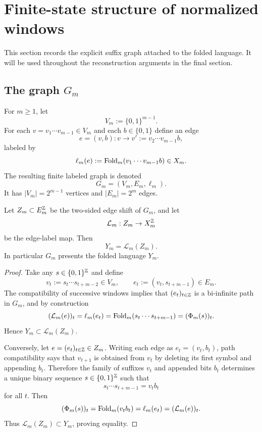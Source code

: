 \section{Finite-state structure of normalized windows}

This section records the explicit suffix graph attached to the folded language.
It will be used throughout the reconstruction arguments in the final section.

\subsection{The graph \texorpdfstring{$G_m$}{Gm}}

\begin{definition}
\label{def:G-m}
For $m\ge 1$, let
\[
V_m:=\{0,1\}^{m-1}.
\]
For each $v=v_1\cdots v_{m-1}\in V_m$ and each $b\in\{0,1\}$ define an edge
\[
e=(v,b):v\to v':=v_2\cdots v_{m-1}b,
\]
labeled by
\[
\ell_m(e):=\operatorname{Fold}_m(v_1\cdots v_{m-1}b)\in X_m.
\]
The resulting finite labeled graph is denoted
\[
G_m=(V_m,E_m,\ell_m).
\]
It has $\lvert V_m\rvert=2^{m-1}$ vertices and $\lvert E_m\rvert=2^m$ edges.
\end{definition}

\begin{theorem}
\label{thm:Phi-m-sofic-graph}
Let $Z_m\subset E_m^{\mathbb{Z}}$ be the two-sided edge shift of $G_m$, and let
\[
\mathcal L_m:Z_m\to X_m^{\mathbb{Z}}
\]
be the edge-label map.  Then
\[
Y_m=\mathcal L_m(Z_m).
\]
In particular $G_m$ presents the folded language $Y_m$.
\end{theorem}

\begin{proof}
Take any $s\in\{0,1\}^{\mathbb{Z}}$ and define
\[
v_t:=s_t\cdots s_{t+m-2}\in V_m,
\qquad
e_t:=(v_t,s_{t+m-1})\in E_m.
\]
The compatibility of successive windows implies that $(e_t)_{t\in\mathbb{Z}}$ is a
bi-infinite path in $G_m$, and by construction
\[
(\mathcal L_m(e))_t
=
\ell_m(e_t)
=
\operatorname{Fold}_m(s_t\cdots s_{t+m-1})
=
(\Phi_m(s))_t.
\]
Hence $Y_m\subset \mathcal L_m(Z_m)$.

Conversely, let $e=(e_t)_{t\in\mathbb{Z}}\in Z_m$.  Writing each edge as
$e_t=(v_t,b_t)$, path compatibility says that $v_{t+1}$ is obtained from $v_t$
by deleting its first symbol and appending $b_t$.  Therefore the family of
suffixes $v_t$ and appended bits $b_t$ determines a unique binary sequence
$s\in\{0,1\}^{\mathbb{Z}}$ such that
\[
s_t\cdots s_{t+m-1}=v_tb_t
\]
for all $t$.  Then
\[
(\Phi_m(s))_t
=
\operatorname{Fold}_m(v_tb_t)
=
\ell_m(e_t)
=
(\mathcal L_m(e))_t.
\]
Thus $\mathcal L_m(Z_m)\subset Y_m$, proving equality.
\end{proof}

